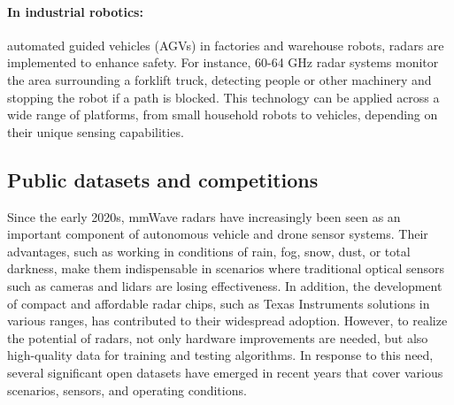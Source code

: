 \paragraph{In industrial robotics:} automated guided vehicles (AGVs) in factories and warehouse robots, radars are implemented to enhance safety. For instance, 60-64 GHz radar systems monitor the area surrounding a forklift truck, detecting people or other machinery and stopping the robot if a path is blocked.\citep{TI_RadarToolbox_Latest}
This technology can be applied across a wide range of platforms, from small household robots to vehicles, depending on their unique sensing capabilities.


\subsection{Public datasets and competitions}
Since the early 2020s, mmWave radars have increasingly been seen as an important component of autonomous vehicle and drone sensor systems. Their advantages, such as working in conditions of rain, fog, snow, dust, or total darkness, make them indispensable in scenarios where traditional optical sensors such as cameras and lidars are losing effectiveness. In addition, the development of compact and affordable radar chips, such as Texas Instruments solutions in various ranges, has contributed to their widespread adoption. However, to realize the potential of radars, not only hardware improvements are needed, but also high-quality data for training and testing algorithms. In response to this need, several significant open datasets have emerged in recent years that cover various scenarios, sensors, and operating conditions.

